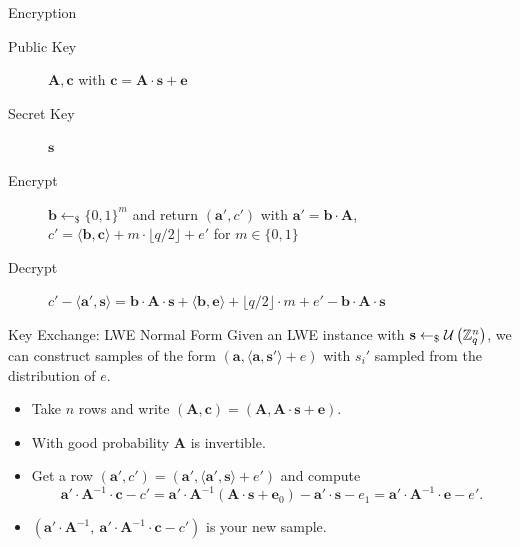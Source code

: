 \documentclass[presentation,smaller]{beamer}
\newcommand{\ZZ}[1][blank]{\ensuremath{\ifthenelse{\equal{#1}{blank}}{\mathbb{Z}}{\mathbb{Z}\left[#1\right]}\xspace}}
\renewcommand{\U}[1]{\ensuremath{\mathcal{U}\left( {#1} \right)}\xspace}
\renewcommand{\vec}[1]{\ensuremath{\mathbf{#1}}\xspace}
\newcommand{\sample}{\ensuremath{\leftarrow_{\$}}}
\begin{document}
\begin{frame}[label={sec:orgheadline15}]{Encryption}
\begin{description}
\item[{Public Key}] \(\vec{A},\vec{c}\) with \(\vec{c} = \vec{A}\cdot \vec{s} + \vec{e}\)
\item[{Secret Key}] \(\vec{s}\)
\item[{Encrypt}] \(\vec{b} \sample \{0,1\}^m\) and return \((\vec{a}',c')\) with \(\vec{a}' = \vec{b} \cdot \vec{A}\), \(c' = \langle \vec{b}, \vec{c} \rangle + m \cdot \lfloor q/2\rfloor + e'\) for \(m \in \{0,1\}\)

\item[{Decrypt}] \(c' - \langle \vec{a}', \vec{s} \rangle = \vec{b} \cdot \vec{A} \cdot \vec{s} + \langle \vec{b}, \vec{e} \rangle + \lfloor q/2 \rfloor \cdot m + e' -  \vec{b} \cdot \vec{A} \cdot \vec{s}\)
\end{description}
\end{frame}

\begin{frame}[label={sec:orgheadline16}]{Key Exchange: LWE Normal Form}
Given an LWE instance with \(\vec{s} \sample \U{\ZZ_q^n}\), we can construct samples of the form \((\vec{a}, \langle \vec{a}, \vec{s}'\rangle+e)\) with \(s_i'\) sampled from the distribution of \(e\).

\begin{itemize}
\item Take \(n\) rows and write \((\vec{A}, \vec{c}) = (\vec{A}, \vec{A}⋅\vec{s} + \vec{e})\).

\item With good probability \(\vec{A}\) is invertible.

\item Get a row \((\vec{a}', c') = (\vec{a}', \langle \vec{a}', \vec{s}\rangle + e')\) and compute  \[\vec{a}'⋅ \vec{A}^{-1} ⋅ \vec{c}-c' = \vec{a}' ⋅ \vec{A}^{-1} (\vec{A}⋅ \vec{s}+\vec{e}_0)- \vec{a}'·\vec{s}-e_1 = \vec{a}' ⋅ \vec{A}^{-1} ⋅ \vec{e} - e'.\]

\item \((\vec{a}' ⋅ \vec{A}^{-1},\  \vec{a}'⋅ \vec{A}^{-1} ⋅ \vec{c}-c')\) is your new sample.
\end{itemize}
\end{frame}
\end{document}

